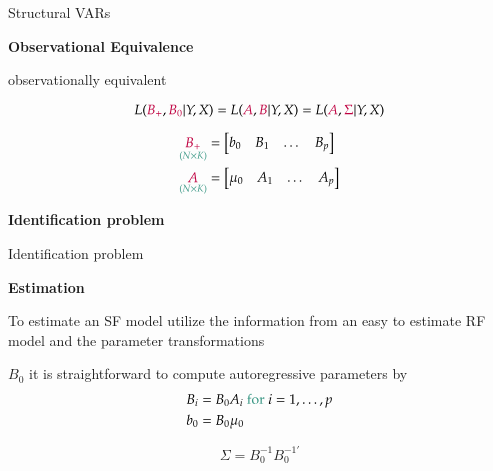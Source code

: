 \documentclass[notes,blackandwhite,mathsans,usenames,dvipsnames]{beamer}
\begin{document}
\begin{frame}{Structural VARs}

\textbf{Observational Equivalence}

 {\color{purple}observationally equivalent}

$$ L({\color{purple}B_{+}},{\color{purple}B_0}|Y,X) = L({\color{purple}A},{\color{purple}B}|Y,X) = L({\color{purple}A},{\color{purple}\Sigma}|Y,X) $$

\begin{align*} 
\underset{\color{mcxs2}(N\times K)}{{\color{purple}B_{+}}} &= \begin{bmatrix} b_0 & B_1 &\dots & B_p \end{bmatrix}\\
\underset{\color{mcxs2}(N\times K)}{{\color{purple}A}} &= \begin{bmatrix} \mu_0 & A_1 &\dots & A_p \end{bmatrix}
\end{align*} 

\end{frame}





{
\begin{frame}

\begin{adjustwidth}{-0.5cm}{0cm}
\vspace{8.3cm}\Large
\textbf{{\color{mcxs1}Identification} {\color{mcxs5}problem}}
\end{adjustwidth}

\end{frame}
}



\begin{frame}{Identification problem}

\textbf{Estimation}

{\color{mcxs2}To estimate an} {\color{purple}SF} {\color{mcxs2}model utilize the information from an easy to estimate} {\color{purple}RF} {\color{mcxs2}model and the parameter transformations}

 $B_0$ {\color{mcxs2}it is straightforward to compute autoregressive parameters by}
\begin{align*}
B_i&=B_0A_i \text{ \color{mcxs2} for }i=1,\dots,p\\
b_0&=B_0\mu_0
\end{align*}

$$\Sigma = B_0^{-1}B_0^{-1\prime}$$

\end{frame}
\end{document}

